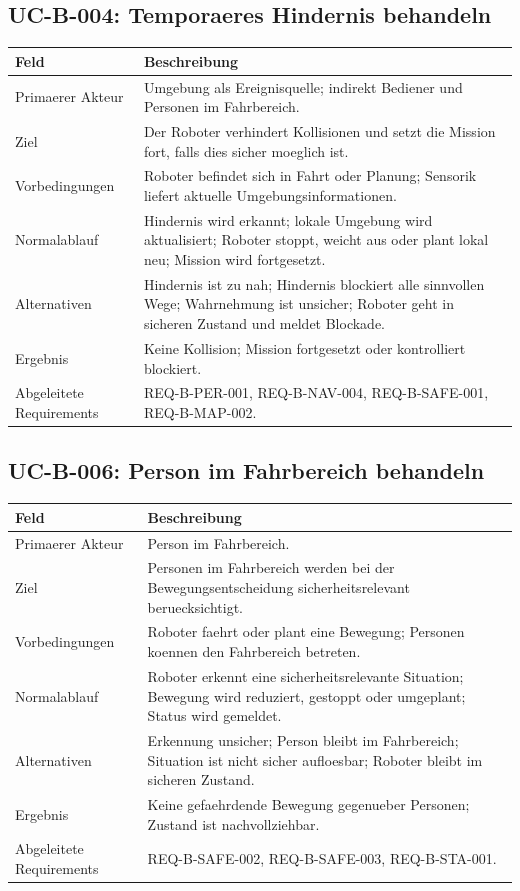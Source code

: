 \subsection{UC-B-004: Temporaeres Hindernis behandeln}

\begin{longtable}{L{0.24\textwidth} L{0.64\textwidth}}
\toprule
Feld & Beschreibung \\
\midrule
Primaerer Akteur & Umgebung als Ereignisquelle; indirekt Bediener und Personen im Fahrbereich. \\
Ziel & Der Roboter verhindert Kollisionen und setzt die Mission fort, falls dies sicher moeglich ist. \\
Vorbedingungen & Roboter befindet sich in Fahrt oder Planung; Sensorik liefert aktuelle Umgebungsinformationen. \\
Normalablauf & Hindernis wird erkannt; lokale Umgebung wird aktualisiert; Roboter stoppt, weicht aus oder plant lokal neu; Mission wird fortgesetzt. \\
Alternativen & Hindernis ist zu nah; Hindernis blockiert alle sinnvollen Wege; Wahrnehmung ist unsicher; Roboter geht in sicheren Zustand und meldet Blockade. \\
Ergebnis & Keine Kollision; Mission fortgesetzt oder kontrolliert blockiert. \\
Abgeleitete Requirements & REQ-B-PER-001, REQ-B-NAV-004, REQ-B-SAFE-001, REQ-B-MAP-002. \\
\bottomrule
\end{longtable}

\subsection{UC-B-006: Person im Fahrbereich behandeln}

\begin{longtable}{L{0.24\textwidth} L{0.64\textwidth}}
\toprule
Feld & Beschreibung \\
\midrule
Primaerer Akteur & Person im Fahrbereich. \\
Ziel & Personen im Fahrbereich werden bei der Bewegungsentscheidung sicherheitsrelevant beruecksichtigt. \\
Vorbedingungen & Roboter faehrt oder plant eine Bewegung; Personen koennen den Fahrbereich betreten. \\
Normalablauf & Roboter erkennt eine sicherheitsrelevante Situation; Bewegung wird reduziert, gestoppt oder umgeplant; Status wird gemeldet. \\
Alternativen & Erkennung unsicher; Person bleibt im Fahrbereich; Situation ist nicht sicher aufloesbar; Roboter bleibt im sicheren Zustand. \\
Ergebnis & Keine gefaehrdende Bewegung gegenueber Personen; Zustand ist nachvollziehbar. \\
Abgeleitete Requirements & REQ-B-SAFE-002, REQ-B-SAFE-003, REQ-B-STA-001. \\
\bottomrule
\end{longtable}

